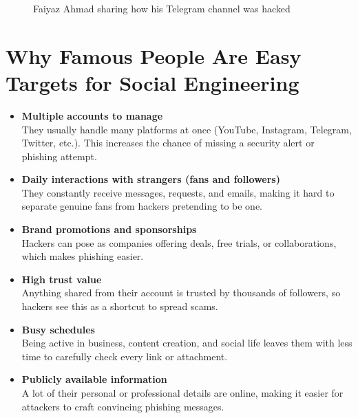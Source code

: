\documentclass[12pt]{article}
\begin{document}
\begin{figure}[H]
    \centering
    \caption{Faiyaz Ahmad sharing how his Telegram channel was hacked}
\end{figure}

\section*{Why Famous People Are Easy Targets for Social Engineering}

\begin{itemize}
    \item \textbf{Multiple accounts to manage}\\
    They usually handle many platforms at once (YouTube, Instagram, Telegram, Twitter, etc.). This increases the chance of missing a security alert or phishing attempt.

    \item \textbf{Daily interactions with strangers (fans and followers)}\\
    They constantly receive messages, requests, and emails, making it hard to separate genuine fans from hackers pretending to be one.

    \item \textbf{Brand promotions and sponsorships}\\
    Hackers can pose as companies offering deals, free trials, or collaborations, which makes phishing easier.

    \item \textbf{High trust value}\\
    Anything shared from their account is trusted by thousands of followers, so hackers see this as a shortcut to spread scams.

    \item \textbf{Busy schedules}\\
    Being active in business, content creation, and social life leaves them with less time to carefully check every link or attachment.

    \item \textbf{Publicly available information}\\
    A lot of their personal or professional details are online, making it easier for attackers to craft convincing phishing messages.
\end{itemize}
\end{document}
